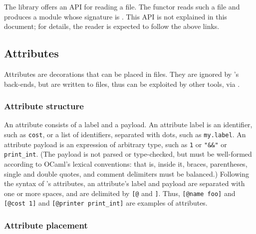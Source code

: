 \documentclass[onecolumn,11pt,nocopyrightspace,preprint]{sigplanconf}
\begin{document}
The library \menhirsdk offers an API for reading a \cmly file.
The functor 
reads such a file and produces a module whose signature is
.
This API is not explained in this document; for details,
the reader is expected to follow the above links.


\subsection{Attributes}
\label{sec:attributes}

Attributes are decorations that can be placed in \mly files.
They are ignored by \menhir's back-ends,
but are written to \cmly files,
thus can be exploited by other tools, via \menhirsdk.

\subsubsection{Attribute structure}

An attribute consists of a label and a payload. An attribute label is an \ocaml
identifier, such as \texttt{cost}, or a list of \ocaml identifiers, separated
with dots, such as \texttt{my.label}. An attribute payload is an \ocaml
expression of arbitrary type, such as \texttt{1} or \verb+"&&"+ or \verb+print_int+.
%
(The payload is not parsed or type-checked, but must be well-formed according
to OCaml's lexical conventions: that is, inside it, braces, parentheses,
single and double quotes, and comment delimiters must be balanced.)
%
Following the syntax of \ocaml's attributes, an attribute's label and payload
are separated with one or more spaces, and are delimited by \verb+[@+ and
\verb+]+. Thus,
\verb+[@name foo]+
and
\verb+[@cost 1]+
and
\verb+[@printer print_int]+
are examples of attributes.

\subsubsection{Attribute placement}
\label{sec:attributes:placement}
\end{document}
